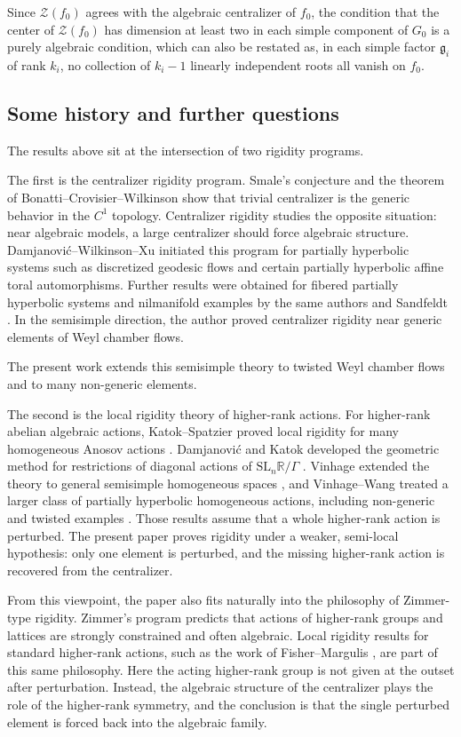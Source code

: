 \documentclass[11pt]{amsart}
\numberwithin{equation}{section}
\newcommand{\R}{\mathbb{R}}
\theoremstyle{plain}
\begin{document}
Since $\mathcal Z(f_0)$ agrees with the algebraic centralizer of $f_0$, the condition that the center of $\mathcal Z(f_0)$ has dimension at least two in each simple component of $G_0$ is a purely algebraic condition, which can also be restated as, in each simple factor $\mathfrak g_i$ of rank $k_i$, no collection of $k_i-1$ linearly independent roots all vanish on $f_0$.

\subsection{Some history and further questions}
The results above sit at the intersection of two rigidity programs.

The first is the centralizer rigidity program.  Smale's conjecture and the
theorem of Bonatti--Crovisier--Wilkinson \cite{BCW} show that trivial
centralizer is the generic behavior in the \(C^1\) topology.  Centralizer
rigidity studies the opposite situation: near algebraic models, a large
centralizer should force algebraic structure.  Damjanovi\'c--Wilkinson--Xu
\cite{DWX} initiated this program for partially hyperbolic systems such as
discretized geodesic flows and certain partially hyperbolic affine toral automorphisms.  Further
results were obtained for fibered partially hyperbolic systems and nilmanifold examples by the same authors and Sandfeldt \cite{DWX23, Sandfeldt}.  In the semisimple direction,
the author \cite{Wang} proved centralizer rigidity near generic elements of Weyl
chamber flows.

The present work extends this semisimple theory to twisted
Weyl chamber flows and to many non-generic elements.

The second is the local rigidity theory of higher-rank actions.  For
higher-rank abelian algebraic actions, Katok--Spatzier proved local
rigidity for many homogeneous Anosov actions \cite{KS}.  Damjanovi\'c and
Katok developed the geometric method for restrictions of diagonal actions of $\mathrm{SL}_n\R/\Gamma$
\cite{DK}.  Vinhage extended the theory to general semisimple homogeneous
spaces \cite{Vinhage}, and Vinhage--Wang treated a larger class of partially
hyperbolic homogeneous actions, including non-generic and twisted examples \cite{VinWang}.
Those results assume that a whole higher-rank action is perturbed.  The
present paper proves rigidity under a weaker, semi-local hypothesis: only
one element is perturbed, and the missing higher-rank action is recovered
from the centralizer.

From this viewpoint, the paper also fits naturally into the philosophy of
Zimmer-type rigidity.  Zimmer's program predicts that actions of
higher-rank groups and lattices are strongly constrained and often
algebraic.  Local rigidity results for standard higher-rank actions, such as
the work of Fisher--Margulis \cite{FM}, are part of this same philosophy.
Here the acting higher-rank group is not given at the outset after
perturbation.  Instead, the algebraic structure of the centralizer
plays the role of the higher-rank symmetry, and the conclusion is that the
single perturbed element is forced back into the algebraic family.
\end{document}
